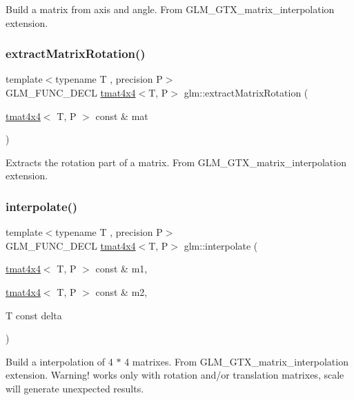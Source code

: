 Build a matrix from axis and angle. From G\+L\+M\+\_\+\+G\+T\+X\+\_\+matrix\+\_\+interpolation extension. \mbox{\label{group__gtx__matrix__interpolation_ga6b8170aa4cf43caf81400696ebb38afe}} 
\subsubsection{\texorpdfstring{extract\+Matrix\+Rotation()}{extractMatrixRotation()}}
{\footnotesize\ttfamily template$<$typename T , precision P$>$ \\
G\+L\+M\+\_\+\+F\+U\+N\+C\+\_\+\+D\+E\+CL \hyperlink{structglm_1_1tmat4x4}{tmat4x4}$<$T, P$>$ glm\+::extract\+Matrix\+Rotation (\begin{DoxyParamCaption}\item[{\hyperlink{structglm_1_1tmat4x4}{tmat4x4}$<$ T, P $>$ const \&}]{mat }\end{DoxyParamCaption})}

Extracts the rotation part of a matrix. From G\+L\+M\+\_\+\+G\+T\+X\+\_\+matrix\+\_\+interpolation extension. \mbox{\label{group__gtx__matrix__interpolation_ga45099a92c5c704503565619ac2bcd5c6}} 
\subsubsection{\texorpdfstring{interpolate()}{interpolate()}}
{\footnotesize\ttfamily template$<$typename T , precision P$>$ \\
G\+L\+M\+\_\+\+F\+U\+N\+C\+\_\+\+D\+E\+CL \hyperlink{structglm_1_1tmat4x4}{tmat4x4}$<$T, P$>$ glm\+::interpolate (\begin{DoxyParamCaption}\item[{\hyperlink{structglm_1_1tmat4x4}{tmat4x4}$<$ T, P $>$ const \&}]{m1,  }\item[{\hyperlink{structglm_1_1tmat4x4}{tmat4x4}$<$ T, P $>$ const \&}]{m2,  }\item[{T const}]{delta }\end{DoxyParamCaption})}

Build a interpolation of 4 $\ast$ 4 matrixes. From G\+L\+M\+\_\+\+G\+T\+X\+\_\+matrix\+\_\+interpolation extension. Warning! works only with rotation and/or translation matrixes, scale will generate unexpected results. 